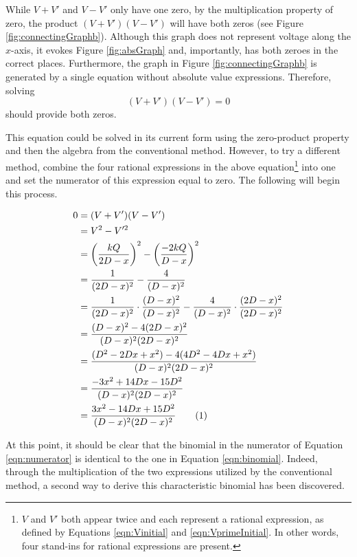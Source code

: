 \documentclass[titlepage]{article}
\begin{document}
While $V+V'$ and $V-V'$ only have one zero, by the multiplication property of zero, the product $(V+V')(V-V')$ will have both zeros (see Figure \ref{fig:connectingGraphb}). Although this graph does not represent voltage along the $x$-axis, it evokes Figure \ref{fig:absGraph} and, importantly, has both zeroes in the correct places. Furthermore, the graph in Figure \ref{fig:connectingGraphb} is generated by a single equation without absolute value expressions. Therefore, solving $$(V+V')(V-V')=0$$ should provide both zeros.\par
This equation could be solved in its current form using the zero-product property and then the algebra from the conventional method. However, to try a different method, combine the four rational expressions in the above equation\footnote{$V$ and $V'$ both appear twice and each represent a rational expression, as defined by Equations \ref{eqn:Vinitial} and \ref{eqn:VprimeInitial}. In other words, four stand-ins for rational expressions are present.} into one and set the numerator of this expression equal to zero. The following will begin this process.

\begin{align*}
    0 &= (V+V')(V-V')\\
    &= V^2-V'^2\\
    &= \left( \frac{kQ}{2D-x} \right)^2-\left( \frac{-2kQ}{D-x} \right)^2\\
    &= \frac{1}{(2D-x)^2}-\frac{4}{(D-x)^2}\\
    &= \frac{1}{(2D-x)^2}\cdot\frac{(D-x)^2}{(D-x)^2}-\frac{4}{(D-x)^2}\cdot\frac{(2D-x)^2}{(2D-x)^2}\\
    &= \frac{(D-x)^2-4(2D-x)^2}{(D-x)^2(2D-x)^2}\\
    &= \frac{(D^2-2Dx+x^2)-4(4D^2-4Dx+x^2)}{(D-x)^2(2D-x)^2}\\
    &= \frac{-3x^2+14Dx-15D^2}{(D-x)^2(2D-x)^2}\\
    &= \frac{3x^2-14Dx+15D^2}{(D-x)^2(2D-x)^2}\stepcounter{equation}\tag{\theequation}\label{eqn:numerator}
\end{align*}

At this point, it should be clear that the binomial in the numerator of Equation \ref{eqn:numerator} is identical to the one in Equation \ref{eqn:binomial}. Indeed, through the multiplication of the two expressions utilized by the conventional method, a second way to derive this characteristic binomial has been discovered.
\end{document}
